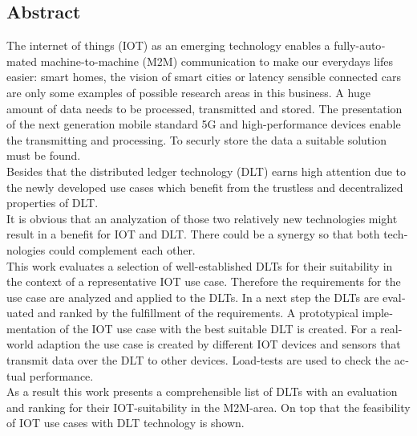 

\begin{otherlanguage}{american}
	\chapter*{Abstract}
	The internet of things (IOT) as an emerging technology enables a fully-automated machine-to-machine (M2M) communication to make our everydays lifes easier: smart homes, the vision of smart cities or latency sensible connected cars are only some examples of possible research areas in this business. A huge amount of data needs to be processed, transmitted and stored. The presentation of the next generation mobile standard 5G and high-performance devices enable the transmitting and processing. To securly store the data a suitable solution must be found.\\
	Besides that the distributed ledger technology (DLT) earns high attention due to the newly developed use cases which benefit from the trustless and decentralized properties of DLT.\\
	It is obvious that an analyzation of those two relatively new technologies might result in a benefit for IOT and DLT. There could be a synergy so that both technologies could complement each other.\\
	This work evaluates a selection of well-established DLTs for their suitability in the context of a representative IOT use case. Therefore the requirements for the use case are analyzed and applied to the DLTs. In a next step the DLTs are evaluated and ranked by the fulfillment of the requirements. A prototypical implementation of the IOT use case with the best suitable DLT is created. For a real-world adaption the use case is created by different IOT devices and sensors that transmit data over the DLT to other devices. Load-tests are used to check the actual performance.\\
	As a result this work presents a comprehensible list of DLTs with an evaluation and ranking for their IOT-suitability in the M2M-area. On top that the feasibility of IOT use cases with DLT technology is shown.
\end{otherlanguage}
